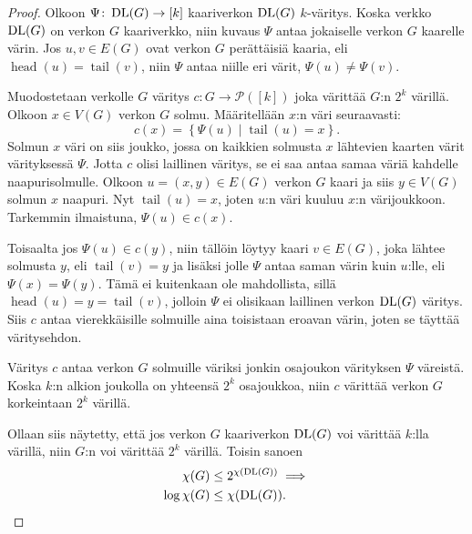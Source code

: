 \documentclass[finnish]{tktltiki2}
\theoremstyle{definition}
\theoremstyle{remark}
\newcommand{\set}[1]{\left\{ #1 \right\}}
\newcommand{\powerset}{\mathcal{P}}
\newcommand{\from}{\colon}
\DeclareMathOperator{\head}{head}
\DeclareMathOperator{\tail}{tail}
\begin{document}
\begin{proof}
    Olkoon $\Psi \from \DLG \to [k]$ kaariverkon $\operatorname{DL}(G)$ $k$-väritys. Koska
    verkko $\operatorname{DL}(G)$ on verkon $G$ kaariverkko, niin kuvaus $\Psi$ antaa
    jokaiselle verkon $G$ kaarelle värin. Jos $u, v \in E(G)$ ovat verkon $G$
    perättäisiä kaaria, eli $\head(u) = \tail(v)$, niin $\Psi$ antaa niille eri
    värit, $\Psi(u) \neq \Psi(v)$.

    Muodostetaan verkolle $G$ väritys $c \from G \to \powerset([k])$ joka
    värittää $G$:n $2^k$ värillä. Olkoon $x \in V(G)$ verkon $G$ solmu.
    Määritellään $x$:n väri seuraavasti:
    \begin{equation*}
        c(x) = \set{\Psi(u) \mid \tail(u) = x}.
    \end{equation*}
    Solmun $x$ väri on siis joukko, jossa on kaikkien solmusta $x$ lähtevien
    kaarten värit värityksessä $\Psi$. Jotta $c$ olisi laillinen väritys, se ei
    saa antaa samaa väriä kahdelle naapurisolmulle. Olkoon $u = (x,y) \in E(G)$
    verkon $G$ kaari ja siis $y \in V(G)$ solmun $x$ naapuri. Nyt $\tail(u) =
    x$, joten $u$:n väri kuuluu $x$:n värijoukkoon. Tarkemmin ilmaistuna,
    $\Psi(u) \in c(x)$.

    Toisaalta jos $\Psi(u) \in c(y)$, niin tällöin löytyy kaari $v \in E(G)$,
    joka lähtee solmusta $y$, eli $\tail(v) = y$ ja lisäksi jolle $\Psi$ antaa
    saman värin kuin $u$:lle, eli $\Psi(x) = \Psi(y)$. Tämä ei kuitenkaan ole
    mahdollista, sillä $\head(u) = y = \tail(v)$, jolloin $\Psi$ ei olisikaan
    laillinen verkon $\operatorname{DL}(G)$ väritys. Siis $c$ antaa vierekkäisille solmuille
    aina toisistaan eroavan värin, joten se täyttää väritysehdon.


    Väritys $c$ antaa verkon $G$ solmuille väriksi jonkin osajoukon värityksen
    $\Psi$ väreistä. Koska $k$:n alkion joukolla on yhteensä $2^k$ osajoukkoa,
    niin $c$ värittää verkon $G$ korkeintaan $2^k$ värillä.

    Ollaan siis näytetty, että jos verkon $G$ kaariverkon $\operatorname{DL}(G)$ voi värittää $k$:lla
    värillä, niin $G$:n voi värittää $2^k$ värillä. Toisin sanoen
    \begin{align*}
        \chi(G) &\leq 2^{\chi(\operatorname{DL}(G))} \implies \\
        \log \chi(G) &\leq \chi(\operatorname{DL}(G)). \qedhere
    \end{align*}
\end{proof}
\end{document}
